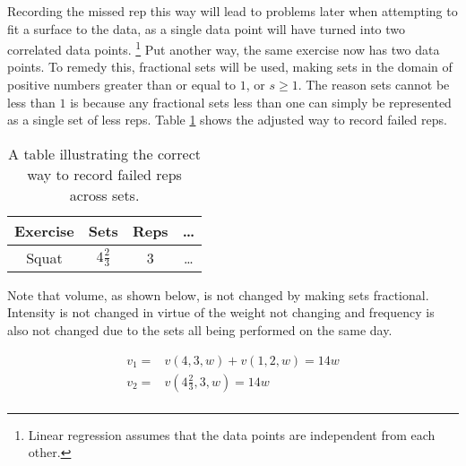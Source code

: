Recording the missed rep this way will lead to problems later when attempting to fit a surface to the data, as a single data point will have turned into two correlated data points. \footnote{Linear regression assumes that the data points are independent from each other.} Put another way, the same exercise now has two data points. To remedy this, fractional sets will be used, making sets in the domain of positive numbers greater than or equal to $1$, or $s\ge 1$. The reason sets cannot be less than $1$ is because any fractional sets less than one can simply be represented as a single set of less reps. Table \ref{tab:FailedSetExampleCorrectData} shows the adjusted way to record failed reps.

\begin{table}[h]
    \centering
    \begin{tabular}{c|c|c|c}
        Exercise & Sets & Reps & \dots \\
        \hline
        Squat & $4\frac{2}{3}$ & 3 & \dots \\
    \end{tabular}
    \caption{A table illustrating the correct way to record failed reps across sets.}
    \label{tab:FailedSetExampleCorrectData}
\end{table}

Note that volume, as shown below, is not changed by making sets fractional. Intensity is not changed in virtue of the weight not changing and frequency is also not changed due to the sets all being performed on the same day.

\begin{equation*}
    \begin{split}
        v_1=&v(4,3,w)+v(1,2,w)=14w \\
        v_2=&v\left(4\frac{2}{3},3,w\right)=14w \\
    \end{split}
\end{equation*}